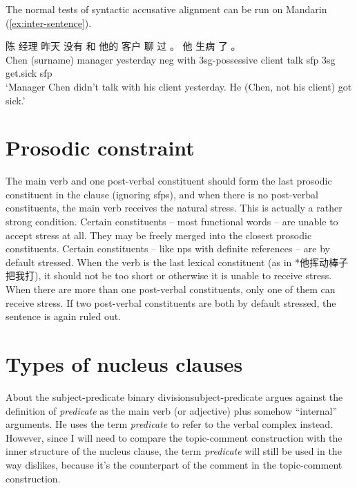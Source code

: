 \documentclass[UTF8, a4paper, oneside, scheme=plain]{ctexrep}
\newcommand*{\term}[1]{\emph{#1}}
\newcommand{\translate}[1]{`#1'}
\begin{document}
The normal tests of syntactic accusative alignment can be run on Mandarin
(\ref{ex:inter-sentence}).

\begin{exe}
    \ex \gll 陈 经理 昨天 没有 和 他的 客户 聊 过 。 他 生病 了 。 \\
    {Chen (surname)} manager yesterday \acs{neg} with 3sg-\acs{possessive} client talk \acs{sfp}
    {} 3sg get.sick \acs{sfp} \\
    \glt \translate{Manager Chen didn't talk with his client yesterday. He (Chen, not his client) got sick.}
    \label{ex:inter-sentence}
\end{exe}

\section{Prosodic constraint}\label{sec:clause.prosodic-constraint}

The main verb and one post-verbal constituent
should form the last prosodic constituent in the clause (ignoring \ac{sfp}s),
and when there is no post-verbal constituents,
the main verb receives the natural stress. 
This is actually a rather strong condition.
Certain constituents -- most functional words -- are unable to accept stress at all.
They may be freely merged into the closest prosodic constituents.
Certain constituents -- like \ac{np}s with definite references -- are by default stressed.
When the verb is the last lexical constituent
(as in *他挥动棒子把我打),
it should not be too short or otherwise it is unable to receive stress.
When there are more than one post-verbal constituents,
only one of them can receive stress.
If two post-verbal constituents are both by default stressed,
the sentence is again ruled out. %

\section{Types of nucleus clauses}

\begin{infobox}{About the subject-predicate binary division}{subject-predicate}
    \citet{dixon2009basic} argues against the definition of \term{predicate} 
    as the main verb (or adjective) plus somehow ``internal'' arguments.
    He uses the term \term{predicate} to refer to the verbal complex instead.
    However, since I will need to compare the topic-comment construction 
    with the inner structure of the nucleus clause,
    the term \term{predicate} will still be used in the way \citet{dixon2009basic} dislikes,
    because it's the counterpart of the comment in the topic-comment construction.
\end{infobox}
\end{document}
